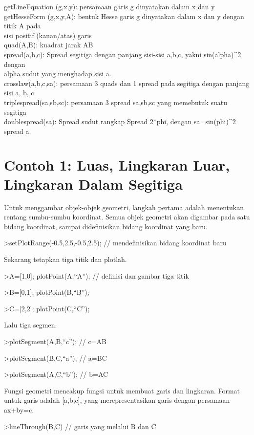 \documentclass[
]{book}
\begin{document}
getLineEquation (g,x,y): persamaan garis g dinyatakan dalam x dan y\\
getHesseForm (g,x,y,A): bentuk Hesse garis g dinyatakan dalam x dan y dengan titik A pada\\
sisi positif (kanan/atas) garis\\
quad(A,B): kuadrat jarak AB\\
spread(a,b,c): Spread segitiga dengan panjang sisi-sisi a,b,c, yakni sin(alpha)\^{}2 dengan\\
alpha sudut yang menghadap sisi a.\\
crosslaw(a,b,c,sa): persamaan 3 quads dan 1 spread pada segitiga dengan panjang sisi a, b, c.\\
triplespread(sa,sb,sc): persamaan 3 spread sa,sb,sc yang memebntuk suatu segitiga\\
doublespread(sa): Spread sudut rangkap Spread 2*phi, dengan sa=sin(phi)\^{}2 spread a.

\section{Contoh 1: Luas, Lingkaran Luar, Lingkaran Dalam Segitiga}\label{contoh-1-luas-lingkaran-luar-lingkaran-dalam-segitiga}

Untuk menggambar objek-objek geometri, langkah pertama adalah menentukan rentang sumbu-sumbu koordinat. Semua objek geometri akan digambar pada satu bidang koordinat, sampai didefinisikan bidang koordinat yang baru.

\textgreater setPlotRange(-0.5,2.5,-0.5,2.5); // mendefinisikan bidang koordinat baru

Sekarang tetapkan tiga titik dan plotlah.

\textgreater A={[}1,0{]}; plotPoint(A,``A''); // definisi dan gambar tiga titik

\textgreater B={[}0,1{]}; plotPoint(B,``B'');

\textgreater C={[}2,2{]}; plotPoint(C,``C'');

Lalu tiga segmen.

\textgreater plotSegment(A,B,``c''); // c=AB

\textgreater plotSegment(B,C,``a''); // a=BC

\textgreater plotSegment(A,C,``b''); // b=AC

Fungsi geometri mencakup fungsi untuk membuat garis dan lingkaran. Format untuk garis adalah {[}a,b,c{]}, yang merepresentasikan garis dengan persamaan ax+by=c.

\textgreater lineThrough(B,C) // garis yang melalui B dan C
\end{document}
